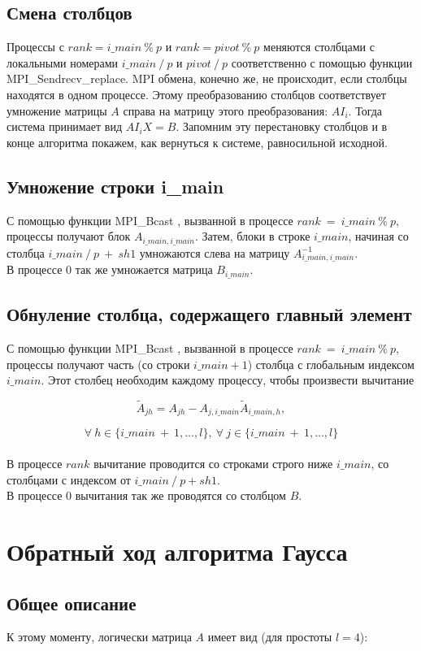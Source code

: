 \documentclass[11pt]{article}
\newcommand{\w}{\widetilde}
\begin{document}
\subsection{Смена столбцов}
\label{itm:swap}
Процессы с $rank=i\_main\ \%\ p$ и $rank=pivot\ \%\ p$ меняются столбцами с локальными номерами $i\_main\ /\ p$ и $pivot\ /\ p$ соответственно с помощью функции MPI\_Sendrecv\_replace.
MPI обмена, конечно же, не происходит, если столбцы находятся в одном процессе.
Этому преобразованию столбцов соответствует умножение матрицы $A$ справа на матрицу этого преобразования: $AI_i$. Тогда система принимает вид $AI_iX=B$. Запомним эту перестановку столбцов и в конце алгоритма покажем, как вернуться к системе, равносильной исходной.
\subsection{Умножение строки i\_main}
С помощью функции MPI\_Bcast \label{itm:multi_one}, вызванной в процессе $rank\ =\ i\_main\ \%\ p$,  процессы получают блок $A_{i\_main, i\_main}$. Затем, блоки в строке $i\_main$, начиная со столбца $i\_main\ /\ p\ +\ sh1$ умножаются слева на матрицу $A^{-1}_{i\_main, i\_main}$.
\\
В процессе $0$ так же умножается матрица $B_{i\_main}$.
\newpage
\enlargethispage{9\baselineskip}
\subsection{Обнуление столбца, содержащего главный элемент}
С помощью функции MPI\_Bcast \label{itm:subtr_all}, вызванной в процессе $rank\ =\ i\_main\ \%\ p$, процессы получают часть (со строки $i\_main + 1$) столбца с глобальным индексом $i\_main$. Этот столбец необходим каждому процессу, чтобы произвести вычитание 

$$\w{A}_{jh} = A_{jh} - A_{j,i\_main}\w{A}_{i\_main,h},$$

$$\forall\ h \in \{i\_main\ +\ 1,\ldots ,l\},\ \forall\ j \in \{i\_main\ +\ 1, \ldots ,l\}$$
\\
В процессе $rank$ вычитание проводится со строками строго ниже $i\_main$, со столбцами с индексом от $i\_main\ /\ p + sh1$.
\\
В процессе $0$ вычитания так же проводятся со столбцом $B$.
\section{Обратный ход алгоритма Гаусса}
\subsection{Общее описание}
К этому моменту, логически матрица $A$ имеет вид (для простоты $l=4$):
\end{document}

